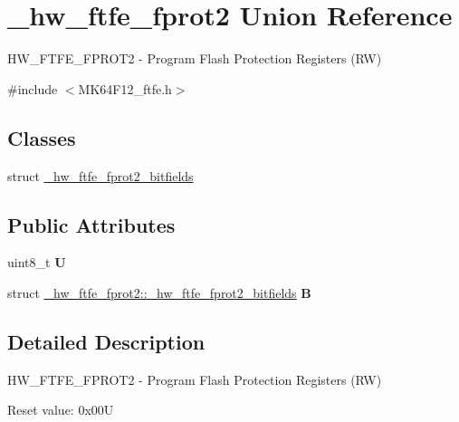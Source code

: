 \hypertarget{union__hw__ftfe__fprot2}{}\section{\+\_\+hw\+\_\+ftfe\+\_\+fprot2 Union Reference}
\label{union__hw__ftfe__fprot2}


H\+W\+\_\+\+F\+T\+F\+E\+\_\+\+F\+P\+R\+O\+T2 -\/ Program Flash Protection Registers (RW)  




{\ttfamily \#include $<$M\+K64\+F12\+\_\+ftfe.\+h$>$}

\subsection*{Classes}
\begin{DoxyCompactItemize}
\item 
struct \hyperlink{struct__hw__ftfe__fprot2_1_1__hw__ftfe__fprot2__bitfields}{\+\_\+hw\+\_\+ftfe\+\_\+fprot2\+\_\+bitfields}
\end{DoxyCompactItemize}
\subsection*{Public Attributes}
\begin{DoxyCompactItemize}
\item 
uint8\+\_\+t {\bfseries U}\hypertarget{union__hw__ftfe__fprot2_a7c16e218a5dcd0791b5d515e1e731e79}{}\label{union__hw__ftfe__fprot2_a7c16e218a5dcd0791b5d515e1e731e79}

\item 
struct \hyperlink{struct__hw__ftfe__fprot2_1_1__hw__ftfe__fprot2__bitfields}{\+\_\+hw\+\_\+ftfe\+\_\+fprot2\+::\+\_\+hw\+\_\+ftfe\+\_\+fprot2\+\_\+bitfields} {\bfseries B}\hypertarget{union__hw__ftfe__fprot2_af8b3f7b2265f981105d25f7901efa1af}{}\label{union__hw__ftfe__fprot2_af8b3f7b2265f981105d25f7901efa1af}

\end{DoxyCompactItemize}


\subsection{Detailed Description}
H\+W\+\_\+\+F\+T\+F\+E\+\_\+\+F\+P\+R\+O\+T2 -\/ Program Flash Protection Registers (RW) 

Reset value\+: 0x00U

